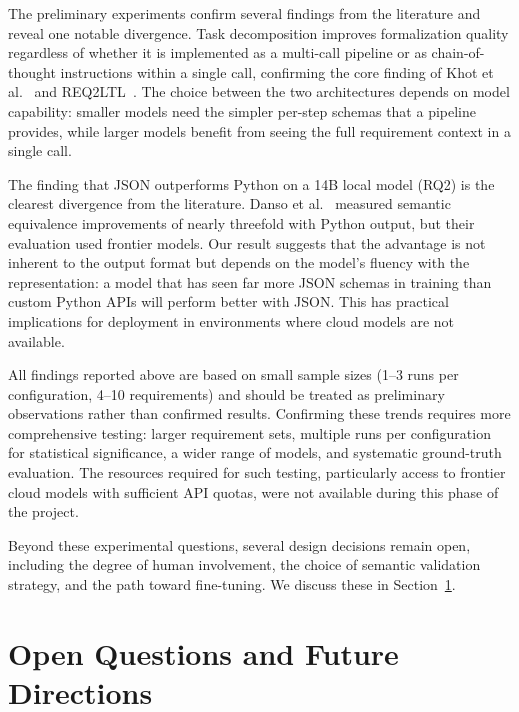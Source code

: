 The preliminary experiments confirm several findings from the literature
and reveal one notable divergence. Task decomposition improves
formalization quality regardless of whether it is implemented as a
multi-call pipeline or as chain-of-thought instructions within a single
call, confirming the core finding of Khot
et al.~\cite{khot2022decomposed} and
REQ2LTL~\cite{ma2025req2ltl}. The choice between the two
architectures depends on model capability: smaller models need the
simpler per-step schemas that a pipeline provides, while larger models
benefit from seeing the full requirement context in a single call.

The finding that JSON outperforms Python on a 14B local model (RQ2) is
the clearest divergence from the literature. Danso
et al.~\cite{danso2026syntax} measured semantic equivalence improvements
of nearly threefold with Python output, but their evaluation used
frontier models. Our result suggests that the advantage is not inherent
to the output format but depends on the model's fluency with the
representation: a model that has seen far more JSON schemas in training
than custom Python APIs will perform better with JSON. This has practical
implications for deployment in environments where cloud models are not
available.

All findings reported above are based on small sample sizes (1--3 runs
per configuration, 4--10 requirements) and should be treated as
preliminary observations rather than confirmed results. Confirming these
trends requires more comprehensive testing: larger requirement sets,
multiple runs per configuration for statistical significance, a wider
range of models, and systematic ground-truth evaluation. The resources
required for such testing, particularly access to frontier cloud models
with sufficient API quotas, were not available during this phase of the
project.

Beyond these experimental questions, several design decisions remain
open, including the degree of human involvement, the choice of semantic
validation strategy, and the path toward fine-tuning. We discuss these
in Section~\ref{sec:future}.


\section{Open Questions and Future Directions}
\label{sec:future}

